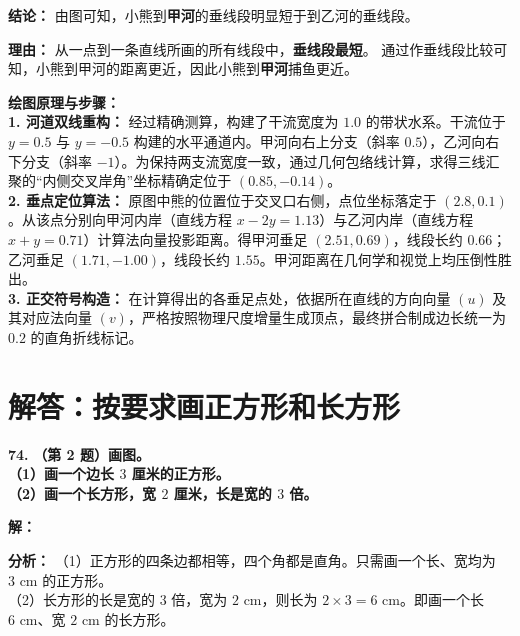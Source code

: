 \vspace{0.3cm}
\textbf{结论：} 由图可知，小熊到\textbf{甲河}的垂线段明显短于到乙河的垂线段。

\textbf{理由：} 从一点到一条直线所画的所有线段中，\textbf{垂线段最短}。
通过作垂线段比较可知，小熊到甲河的距离更近，因此小熊到\textbf{甲河}捕鱼更近。

\vspace{0.4cm}
{\small\color{blue!70!black}
\textbf{绘图原理与步骤：}\\
\textbf{1. 河道双线重构：} 经过精确测算，构建了干流宽度为 $1.0$ 的带状水系。干流位于 $y=0.5$ 与 $y=-0.5$ 构建的水平通道内。甲河向右上分支（斜率 $0.5$），乙河向右下分支（斜率 $-1$）。为保持两支流宽度一致，通过几何包络线计算，求得三线汇聚的“内侧交叉岸角”坐标精确定位于 $(0.85, -0.14)$。\\
\textbf{2. 垂点定位算法：} 原图中熊的位置位于交叉口右侧，点位坐标落定于 $(2.8, 0.1)$。从该点分别向甲河内岸（直线方程 $x - 2y = 1.13$）与乙河内岸（直线方程 $x + y = 0.71$）计算法向量投影距离。得甲河垂足 $(2.51, 0.69)$，线段长约 $0.66$；乙河垂足 $(1.71, -1.00)$，线段长约 $1.55$。甲河距离在几何学和视觉上均压倒性胜出。\\
\textbf{3. 正交符号构造：} 在计算得出的各垂足点处，依据所在直线的方向向量 $(u)$ 及其对应法向量 $(v)$，严格按照物理尺度增量生成顶点，最终拼合制成边长统一为 $0.2$ 的直角折线标记。
}

\newpage



\section{解答：按要求画正方形和长方形}

\vspace{0.6cm}

\textbf{\LARGE 74.} \textbf{（第 2 题）画图。\\[1.5ex]
（1）画一个边长 $3$ 厘米的正方形。\\[1ex]
（2）画一个长方形，宽 $2$ 厘米，长是宽的 $3$ 倍。}

\vspace{0.4cm}
\textbf{解：}

\textbf{分析：}
（1）正方形的四条边都相等，四个角都是直角。只需画一个长、宽均为 $3\text{ cm}$ 的正方形。\\
（2）长方形的长是宽的 $3$ 倍，宽为 $2\text{ cm}$，则长为 $2 \times 3 = 6\text{ cm}$。即画一个长 $6\text{ cm}$、宽 $2\text{ cm}$ 的长方形。

